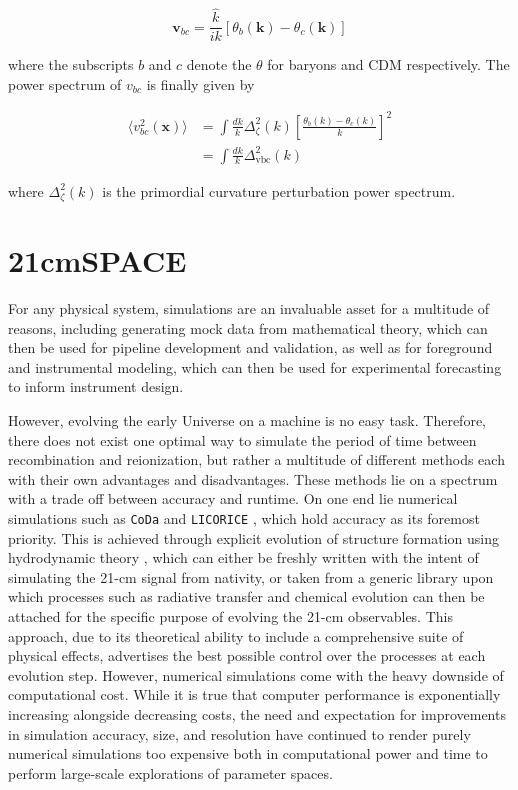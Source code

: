 \documentclass[floats,floatfix,showpacs,amssymb,prd,superscriptaddress,nofootinbib, 11pt]{revtex4-2} %
\newcommand{\code}{\texttt}
\newcommand{\red}{\textcolor{red}}
\begin{document}
\begin{equation}
    \textbf{v}_{bc} = \frac{\hat{k}}{ik} \left[ \theta_b (\textbf{k}) - \theta_c (\textbf{k}) \right]
    \label{eq:vbc_definition}
\end{equation}

\noindent where the subscripts $b$ and $c$ denote the $\theta$ for baryons and CDM respectively. The power spectrum of $v_{bc}$ is finally given by 

\begin{equation}
\begin{split}
        \langle v_{bc}^2 (\textbf{x}) \rangle 
        & = \int \frac{dk}{k} \Delta_\zeta^2 (k) \left[ \frac{\theta_b (k) - \theta_c (k)}{k} \right]^2 \\
        & = \int \frac{dk}{k} \Delta_{\text{vbc}}^2 (k)
\end{split}
\end{equation}

\noindent where $\Delta_\zeta ^2 (k)$ is the primordial curvature perturbation power spectrum.

\newpage
\section{21cmSPACE}
For any physical system, simulations are an invaluable asset for a multitude of reasons, including generating mock data from mathematical theory, which can then be used for pipeline development and validation, as well as for foreground and instrumental modeling, which can then be used for experimental forecasting to inform instrument design. 

However, evolving the early Universe on a machine is no easy task. Therefore, there does not exist one optimal way to simulate the period of time between recombination and reionization, but rather a multitude of different methods each with their own advantages and disadvantages. These methods lie on a spectrum with a trade off between accuracy and runtime. On one end lie numerical simulations such as \code{CoDa} \citep{Ocvirk_2015} and \code{LICORICE} \citep{Semelin_2017}, which hold accuracy as its foremost priority. This is achieved through explicit evolution of structure formation using hydrodynamic theory \citep{gessey-jones_thesis}, which can either be freshly written with the intent of simulating the 21-cm signal from nativity, or taken from a generic library upon which processes such as radiative transfer and chemical evolution can then be attached for the specific purpose of evolving the 21-cm observables. This approach, due to its theoretical ability to include a comprehensive suite of physical effects, advertises the best possible control over the processes at each evolution step. However, numerical simulations come with the heavy downside of computational cost. 
While it is true that computer performance is exponentially increasing alongside decreasing costs, the need and expectation for improvements in simulation accuracy, size, and resolution have continued to render purely numerical simulations too expensive both in computational power and time to perform large-scale explorations of parameter spaces.
\end{document}
